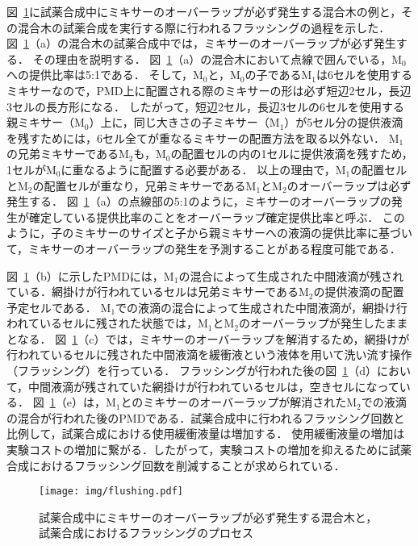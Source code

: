     図~\ref{fig:flushing}に試薬合成中にミキサーのオーバーラップが必ず発生する混合木の例と，その混合木の試薬合成を実行する際に行われるフラッシングの過程を示した．
    図~\ref{fig:flushing}（a）の混合木の試薬合成中では，ミキサーのオーバーラップが必ず発生する．
    その理由を説明する．
    図~\ref{fig:flushing}（a）の混合木において点線で囲んでいる，M$_0$への提供比率は5:1である．
    そして，M$_0$と，M$_0$の子であるM$_1$は6セルを使用するミキサーなので，PMD上に配置される際のミキサーの形は必ず短辺2セル，長辺3セルの長方形になる．
    したがって，短辺2セル，長辺3セルの6セルを使用する親ミキサー（M$_0$）上に，同じ大きさの子ミキサー（M$_1$）が5セル分の提供液滴を残すためには，6セル全てが重なるミキサーの配置方法を取る以外ない．
    M$_1$の兄弟ミキサーであるM$_2$も，M$_0$の配置セルの内の1セルに提供液滴を残すため，1セルがM$_0$に重なるように配置する必要がある．
    以上の理由で，M$_1$の配置セルとM$_2$の配置セルが重なり，兄弟ミキサーであるM$_1$とM$_2$のオーバーラップは必ず発生する．
    図~\ref{fig:flushing}（a）の点線部の5:1のように，ミキサーのオーバーラップの発生が確定している提供比率のことをオーバーラップ確定提供比率と呼ぶ．
    このように，子のミキサーのサイズと子から親ミキサーへの液滴の提供比率に基づいて，ミキサーのオーバーラップの発生を予測することがある程度可能である．
    
    図~\ref{fig:flushing}（b）に示したPMDには，M$_1$の混合によって生成された中間液滴が残されている．網掛けが行われているセルは兄弟ミキサーであるM$_2$の提供液滴の配置予定セルである．
    M$_1$での液滴の混合によって生成された中間液滴が，網掛け行われているセルに残された状態では，M$_1$とM$_2$のオーバーラップが発生したままとなる．
    図~\ref{fig:flushing}（c）では，ミキサーのオーバーラップを解消するため，網掛けが行われているセルに残された中間液滴を緩衝液という液体を用いて洗い流す操作（フラッシング）を行っている．
    フラッシングが行われた後の図~\ref{fig:flushing}（d）において，中間液滴が残されていた網掛けが行われているセルは，空きセルになっている．
    図~\ref{fig:flushing}（e）は，M$_1$とのミキサーのオーバーラップが解消されたM$_2$での液滴の混合が行われた後のPMDである．試薬合成中に行われるフラッシング回数と比例して，試薬合成における使用緩衝液量は増加する．
    使用緩衝液量の増加は実験コストの増加に繋がる．したがって，実験コストの増加を抑えるために試薬合成におけるフラッシング回数を削減することが求められている．

 \begin{figure}[tbp]
    \centering\texttt{[image: img/flushing.pdf]}
    \caption{試薬合成中にミキサーのオーバーラップが必ず発生する混合木と，試薬合成におけるフラッシングのプロセス}\label{fig:flushing}
    
\end{figure}

